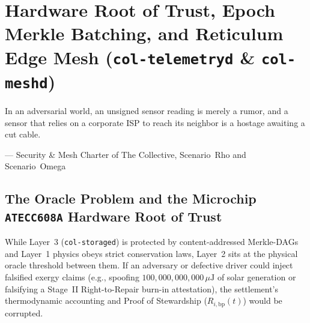 \chapter{Hardware Root of Trust, Epoch Merkle Batching, and Reticulum Edge Mesh (\texttt{col-telemetryd} \& \texttt{col-meshd})}
\label{ch:hardware-root-of-trust-and-mesh}

\epigraph{In an adversarial world, an unsigned sensor reading is merely a rumor, and a sensor that relies on a corporate ISP to reach its neighbor is a hostage awaiting a cut cable.}{--- Security \& Mesh Charter of The Collective, Scenario~Rho and Scenario~Omega}

\section{The Oracle Problem and the Microchip \texttt{ATECC608A} Hardware Root of Trust}
\label{sec:l2-atecc608a-root-of-trust}

While Layer~3 (\texttt{col-storaged}) is protected by content-addressed Merkle-DAGs and Layer~1 physics obeys strict conservation laws, Layer~2 sits at the physical oracle threshold between them. If an adversary or defective driver could inject falsified exergy claims (e.g., spoofing $100{,}000{,}000{,}000\,\mu\mathrm{J}$ of solar generation or falsifying a Stage~II Right-to-Repair burn-in attestation), the settlement's thermodynamic accounting and Proof of Stewardship ($R_{i,\mathrm{bp}}(t)$) would be corrupted.

